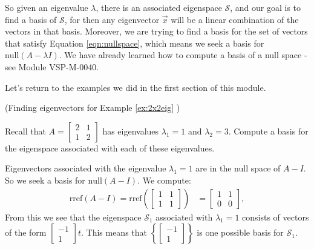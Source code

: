 \documentclass{ximera}
\begin{document}
So given an eigenvalue $\lambda$, there is an associated eigenspace $\mathcal{S}$, and our goal is to find a basis of $\mathcal{S}$, for then any eigenvector $\vec{x}$ will be a linear combination of the vectors in that basis.  Moreover, we are trying to find a basis for the set of vectors that satisfy Equation \ref{eqn:nullspace}, which means we seek a basis for $\mbox{null}(A-\lambda I)$.  We have already learned how to compute a basis of a null space - see Module VSP-M-0040.

Let's return to the examples we did in the first section of this module.

\begin{example} (Finding eigenvectors for Example \ref{ex:2x2eig} ) 

Recall that $A=\begin{bmatrix} 2& 1\\ 1&2
\end{bmatrix}$ has eigenvalues $\lambda_1=1$ and $\lambda_2=3$.  Compute a basis for the eigenspace associated with each of these eigenvalues.
\begin{explanation}
Eigenvectors associated with the eigenvalue $\lambda_1=1$ are in the null space of $A-I$.  So we seek a basis for $\mbox{null}(A-I)$.  We compute:
\begin{align*}\mbox{rref}(A-I)=\mbox{rref}\left(\begin{bmatrix}1&1\\1&1\end{bmatrix}\right)&=\begin{bmatrix}1&1\\0&0\end{bmatrix},
\end{align*}
From this we see that the eigenspace $\mathcal{S}_1$ associated with $\lambda_1=1$ consists of vectors of the form $\begin{bmatrix}-1\\1\end{bmatrix}t$.
This means that $\left\{\begin{bmatrix}-1\\1\end{bmatrix}\right\}$ is one possible basis for $\mathcal{S}_1$.


\end{explanation}
\end{example}
\end{document}
